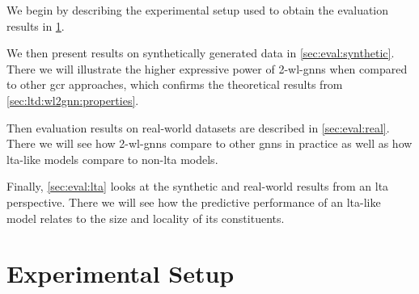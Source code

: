 \begin{enumerate*}[label={\circled{\small\arabic*}}]
	\item We begin by describing the experimental setup used to obtain the evaluation results in \cref{sec:eval:setup}.
	\item We then present results on synthetically generated data in \cref{sec:eval:synthetic}.
	 	There we will illustrate the higher expressive power of 2-\acs{wl}-\acsp{gnn} when compared to other \ac{gcr} approaches, which confirms the theoretical results from \cref{sec:ltd:wl2gnn:properties}.
	\item Then evaluation results on real-world datasets are described in \cref{sec:eval:real}.
		There we will see how 2-\acs{wl}-\acsp{gnn} compare to other \acp{gnn} in practice as well as how \acs{lta}-like models compare to non-\acs{lta} models.
	\item Finally, \cref{sec:eval:lta} looks at the synthetic and real-world results from an \ac{lta} perspective.
		There we will see how the predictive performance of an \acs{lta}-like model relates to the size and locality of its constituents.
\end{enumerate*}

\section{Experimental Setup}%
\label{sec:eval:setup}

